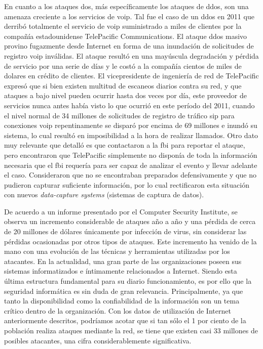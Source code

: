 \documentclass[a4paper,12pt]{report}
\begin{document}
En cuanto a los ataques \ac{dos}, más específicamente los ataques de \ac{ddos}, son una amenaza
creciente a los servicios de \ac{voip}. Tal fue 
el caso de un \ac{ddos} en 2011 que derribó totalmente el servicio de \ac{voip}
suministrado a miles de clientes por la compañía estadounidense TelePacific Communications.
El ataque \ac{ddos} masivo provino fugazmente desde Internet en forma 
de una inundación de solicitudes de registro \ac{voip} inválidas. El ataque resultó
en una mayúscula degradación y pérdida de servicio por una serie de días y le costó a la
compañía cientos de miles de dolares en crédito de clientes.       
El vicepresidente de ingeniería de red de TelePacific expresó que si bien existen multitud de 
escaneos diarios contra su red, y que ataques a bajo nivel pueden ocurrir hasta dos veces 
por día, este proveedor de servicios nunca antes había visto lo que ocurrió en este 
período del 2011, cuando el nivel normal de 34 millones de solicitudes de registro de tráfico \ac{sip}
para conexiones \ac{voip} repentinamente se disparó por encima de 69 millones e inundó su 
sistema, lo cual resultó en imposibilidad a la hora de realizar llamados.
Otro dato muy relevante que detalló es que contactaron a la \ac{fbi} para reportar el ataque, pero encontraron 
que TelePacific simplemente no disponía de toda la información necesaria que el \ac{fbi} requería
para ser capaz de analizar el evento y llevar adelante el caso. Consideraron que no se encontraban
preparados defensivamente y que no pudieron capturar suficiente información, por lo cual rectificaron esta 
situación con nuevos \emph{data-capture systems} (sistemas de captura de datos). \cite{messmer}

De acuerdo a un informe presentado por el Computer Security Institute,
se observa un incremento considerable de ataques año a año y una pérdida
de cerca de 20 millones de dólares únicamente por infección de virus, sin
considerar las pérdidas ocasionadas por otros tipos de ataques. Este
incremento ha venido de la mano con una evolución de las técnicas y
herramientas utilizadas por los atacantes. 
En la actualidad, una gran parte de las organizaciones poseen sus
sistemas informatizados e íntimamente relacionados a Internet. Siendo
esta última estructura fundamental para su diario funcionamiento, es por
ello que la seguridad informática es sin duda de gran relevancia.
Principalmente, ya que tanto la disponibilidad como la confiabilidad de
la información son un tema crítico dentro de la organización. \cite{computersec}
Con los datos de utilización de Internet anteriormente descritos,
podríamos acotar que si tan sólo el 1 por ciento de la población realiza
ataques mediante la red, se tiene que existen casi 33 millones de
posibles atacantes, una cifra considerablemente significativa.
\end{document}
